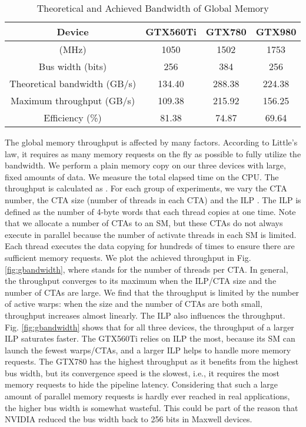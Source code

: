 \documentclass[10pt,journal,compsoc]{IEEEtran}
\theoremstyle{definition}
\begin{document}
\begin{table}
\renewcommand{\arraystretch}{1.1}
\centering
\caption{Theoretical and Achieved Bandwidth of Global Memory}
\label{tab:bandwidth}
\begin{tabular}{|c|c|c|c|}
  \hline
Device & GTX560Ti&GTX780&GTX980 \\ \hline
   (MHz) &1050&1502&1753 \\ \hline
  Bus width (bits) & 256 &384 & 256 \\ \hline
  Theoretical bandwidth (GB/s) & 134.40 & 288.38 & 224.38 \\ \hline
  Maximum throughput (GB/s) & 109.38 & 215.92 & 156.25 \\ \hline
  Efficiency (\%) & 81.38 & 74.87 & 69.64 \\
  \hline
\end{tabular}
\end{table}



The global memory throughput is affected by many factors. According to Little's law, it requires as many memory requests on the fly as possible to fully utilize the bandwidth. We perform a plain memory copy on our three devices with large, fixed amounts of data. We measure the total elapsed time on the CPU. The throughput is calculated as . For each group of experiments, we vary the CTA number, the CTA size (number of threads in each CTA) and the ILP \cite{volkov2010better}. The ILP is defined as the number of 4-byte words that each thread copies at one time. Note that we allocate a number of CTAs to an SM, but these CTAs do not always execute in parallel because the number of activate threads in each SM is limited. Each thread executes the data copying for hundreds of times to ensure there are sufficient memory requests. We plot the achieved throughput in Fig. \ref{fig:gbandwidth}, where  stands for the number of threads per CTA. In general, the throughput converges to its maximum when the ILP/CTA size and the number of CTAs are large. We find that the throughput is limited by the number of active warps: when the size and the number of CTAs are both small, throughput increases almost linearly. The ILP also influences the throughput. Fig. \ref{fig:gbandwidth} shows that for all three devices, the throughput of a larger ILP saturates faster. The GTX560Ti relies on ILP the most, because its SM can launch the fewest warps/CTAs, and a larger ILP helps to handle more memory requests. The GTX780 has the highest throughput as it benefits from the highest bus width, but its convergence speed is the slowest, i.e., it requires the most memory requests to hide the pipeline latency. Considering that such a large amount of parallel memory requests is hardly ever reached in real applications, the higher bus width is somewhat wasteful. This could be part of the reason that NVIDIA reduced the bus width back to 256 bits in Maxwell devices.
\end{document}
